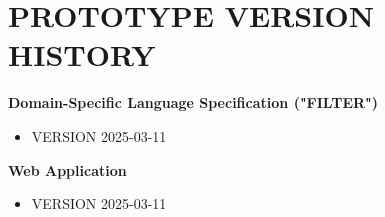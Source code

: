 %
%
%
%	 
%



\chapter{\uppercase {Prototype Version History}}\label{appendix:D}

\noindent \textbf{Domain-Specific Language Specification ("FILTER")}
\newline

\begin{itemize}
    \item \MakeUppercase{VERSION 2025-03-11}
\end{itemize}

\noindent \textbf{Web Application}
\newline

\begin{itemize}
    \item \MakeUppercase{VERSION 2025-03-11}
\end{itemize}
\pagebreak{}